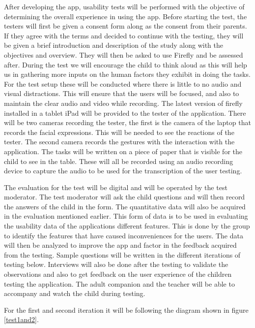 After developing the app, usability tests will be performed with the objective of determining the overall experience in using the app. Before starting the test, the testers will first be given a consent form along as the consent from their parents. If they agree with the terms and decided to continue with the testing, they will be given a brief introduction and description of the study along with the objectives and overview. They will then be asked to use Firefly and be assessed after. During the test we will encourage the child to think aloud as this will help us in gathering more inputs on the human factors they exhibit in doing the tasks. For the test setup these will be conducted where there is little to no audio and visual distractions. This will ensure that the users will be focused, and also to maintain the clear audio and video while recording. The latest version of firefly installed in a tablet iPad will be provided to the tester of the application. There will be two cameras recording the tester, the first is the camera of the laptop that records the facial expressions. This will be needed to see the reactions of the tester. The second camera records the gestures with the interaction with the application. The tasks will be written on a piece of paper that is visible for the child to see in the table. These will all be recorded using an audio recording device to capture the audio to be used for the transcription of the user testing. 

The evaluation for the test will be digital and will be operated by the test moderator. The test moderator will ask the child questions and will then record the answers of the child in the form. The quantitative data will also be acquired in the evaluation mentioned earlier. This form of data is to be used in evaluating the usability data of the applications different features. This is done by the group to identify the features that have caused inconveniences for the users. The data will then be analyzed to improve the app and factor in the feedback acquired from the testing. Sample questions will be written in the different iterations of testing below. Interviews will also be done after the testing to validate the observations and also to get feedback on the user experience of the children testing the application. The adult companion and the teacher will be able to accompany and watch the child during testing.

For the first and second iteration it will be following the diagram shown in figure \ref{test1and2}.

